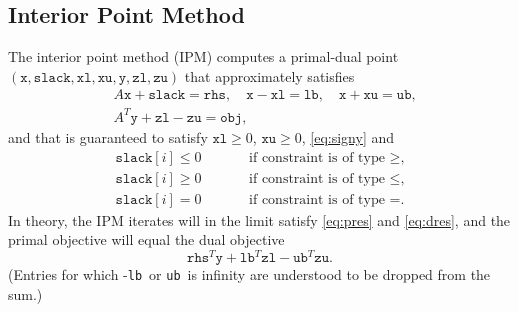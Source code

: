 \documentclass{article}
\newcommand{\ct}{\texttt}
\newcommand{\rvec}[1]{\left(#1\right)}
\newcommand{\obj}{\ct{obj}}
\newcommand{\rhs}{\ct{rhs}}
\newcommand{\lb}{\ct{lb}}
\newcommand{\ub}{\ct{ub}}
\newcommand{\x}{\ct{x}}
\newcommand{\slack}{\ct{slack}}
\newcommand{\xl}{\ct{xl}}
\newcommand{\xu}{\ct{xu}}
\newcommand{\y}{\ct{y}}
\newcommand{\zl}{\ct{zl}}
\newcommand{\zu}{\ct{zu}}
\begin{document}
\subsection{Interior Point Method}
The interior point method (IPM) computes a primal-dual point
$\rvec{\x,\slack,\xl,\xu,\y,\zl,\zu}$ that approximately satisfies
\begin{subequations}
  \label{eq:res}
  \begin{align}
    \label{eq:pres}
    &A\x+\slack=\rhs, \quad \x-\xl=\lb, \quad \x+\xu=\ub,\\
    \label{eq:dres}
    &A^T\y+\zl-\zu=\obj,
  \end{align}
\end{subequations}
and that is guaranteed to satisfy $\xl\ge0$, $\xu\ge0$, \eqref{eq:signy} and
\begin{subequations}
  \label{eq:signslack}
  \begin{alignat}{2}
    \slack[i]\le0 &\quad& &\text{if constraint is of type $\ge$,} \\
    \slack[i]\ge0 && &\text{if constraint is of type $\le$,} \\
    \slack[i]=0 && &\text{if constraint is of type $=$.}
  \end{alignat}
\end{subequations}
In theory, the IPM iterates will in the limit satisfy \eqref{eq:pres} and
\eqref{eq:dres}, and the primal objective will equal the dual objective
\begin{equation}
  \label{eq:dobj}
  \rhs^T\y + \lb^T\zl - \ub^T\zu.
\end{equation}
(Entries for which -\lb\ or \ub\ is infinity are understood to be dropped from
the sum.)
\end{document}
